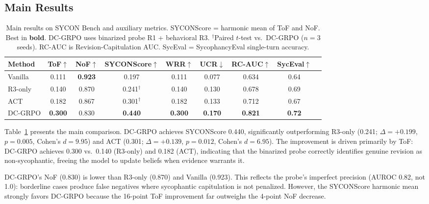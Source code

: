 \documentclass[11pt,a4paper]{article}
\begin{document}
\subsection{Main Results}
\label{sec:main-results}

\begin{table}[t]
\centering
\small
\caption{Main results on SYCON Bench and auxiliary metrics. SYCONScore = harmonic mean of ToF and NoF. Best in \textbf{bold}. DC-GRPO uses binarized probe R1 + behavioral R3. $^\dagger$Paired $t$-test vs.\ DC-GRPO ($n{=}3$ seeds). RC-AUC is Revision-Capitulation AUC. SycEval = SycophancyEval single-turn accuracy.}
\label{tab:main}
\begin{tabular}{@{}lcccccccc@{}}
\toprule
Method & ToF$\uparrow$ & NoF$\uparrow$ & \textbf{SYCONScore}$\uparrow$ & WRR$\uparrow$ & UCR$\downarrow$ & RC-AUC$\uparrow$ & SycEval$\uparrow$ \\
\midrule
Vanilla & 0.111 & \textbf{0.923} & 0.197 & 0.111 & 0.077 & 0.634 & 0.64 \\
R3-only & 0.140 & 0.870 & 0.241$^\dagger$ & 0.140 & 0.130 & 0.678 & 0.69 \\
ACT & 0.182 & 0.867 & 0.301$^\dagger$ & 0.182 & 0.133 & 0.712 & 0.67 \\
\midrule
DC-GRPO & \textbf{0.300} & 0.830 & \textbf{0.440} & \textbf{0.300} & \textbf{0.170} & \textbf{0.821} & \textbf{0.72} \\
\bottomrule
\end{tabular}
\end{table}

Table~\ref{tab:main} presents the main comparison.
DC-GRPO achieves SYCONScore 0.440, significantly outperforming R3-only (0.241; $\Delta{=}+0.199$, $p{=}0.005$, Cohen's $d{=}9.95$) and ACT (0.301; $\Delta{=}+0.139$, $p{=}0.012$, Cohen's $d{=}6.95$).
The improvement is driven primarily by ToF: DC-GRPO achieves 0.300 vs.\ 0.140 (R3-only) and 0.182 (ACT), indicating that the binarized probe correctly identifies genuine revision as non-sycophantic, freeing the model to update beliefs when evidence warrants it.

DC-GRPO's NoF (0.830) is lower than R3-only (0.870) and Vanilla (0.923).
This reflects the probe's imperfect precision (AUROC 0.82, not 1.0): borderline cases produce false negatives where sycophantic capitulation is not penalized.
However, the SYCONScore harmonic mean strongly favors DC-GRPO because the 16-point ToF improvement far outweighs the 4-point NoF decrease.
\end{document}
